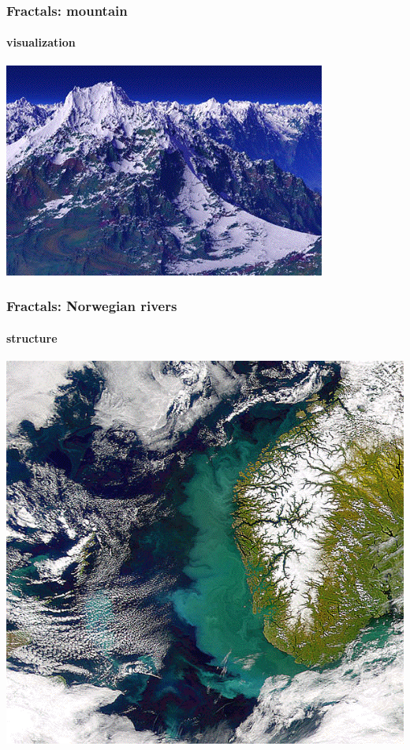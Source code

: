 \documentclass[10pt]{beamer}
\begin{document}
\begin{frame}
\frametitle{Fractals: mountain}
\framesubtitle{visualization}
\begin{center}
\includegraphics[height=0.9\textheight]{figs/fractal19}
\end{center}
\end{frame}
\begin{frame}
\frametitle{Fractals: Norwegian rivers}
\framesubtitle{structure}
\begin{center}
\includegraphics[height=0.9\textheight]{figs/fractal17}
\end{center}
\end{frame}
\end{document}
